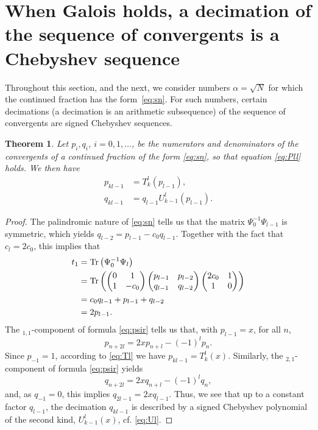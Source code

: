 \documentclass[a4paper,fleqn]{cas-sc}
\def\Tr{{\rm Tr}}
\newtheorem{theorem}{Theorem}[section]
\begin{document}
\section{When Galois holds, a decimation of the sequence of convergents is a Chebyshev sequence}
\label{sec:sec4}
Throughout this section, and the next, we consider numbers $\alpha=\sqrt{N}$ for which the continued fraction has the form~\eqref{eq:sn}. For such numbers, certain decimations (a decimation is an arithmetic subsequence) of the sequence of convergents are signed Chebyshev sequences.
\begin{theorem} \label{thm:tcs}
Let $p_i,q_i$, $i=0,1,\ldots$, be the numerators and denominators of the convergents of a continued fraction of the form \eqref{eq:sn}, so that equation \eqref{eq:Pll} holds. We then have
\begin{equation} \label{eq:pqC}
\begin{split}
p_{kl-1}&=T^l_k(p_{l-1}),\\
q_{kl-1}&=q_{l-1}U^l_{k-1}(p_{l-1}).
\end{split}
\end{equation}
\end{theorem}
\begin{proof}
The palindromic nature of \eqref{eq:sn} tells us that the matrix $\Psi_0^{-1}\Psi_{l-1}$ is symmetric, which yields $q_{l-2}=p_{l-1}-c_0q_{l-1}$. Together with the fact that
$c_l=2c_0$, this implies that
\begin{align*}
t_1&=\Tr\left(\Psi_0^{-1}\Psi_{l}\right)\\
&=\Tr\left(
\begin{pmatrix} 0 & 1 \\ 1 & -c_0 \end{pmatrix}
\begin{pmatrix} p_{l-1} & p_{l-2} \\ q_{l-1} & q_{l-2} \end{pmatrix}
\begin{pmatrix} 2c_0 & 1 \\ 1 & 0 \end{pmatrix}\right)\\
&=c_0q_{l-1}+p_{l-1}+q_{l-2}\\
&=2p_{l-1}.
\end{align*}
The ${}_{1,1}$-component of formula \eqref{eq:psir} tells us that, with $p_{l-1}=x$, for all $n$,
\[
p_{n+2l}=2xp_{n+l}-(-1)^lp_{n}.
\]
Since $p_{-1}=1$, according to \eqref{eq:Tl} we have $p_{kl-1}=T^l_k(x)$.
Similarly, the ${}_{2,1}$-component of formula \eqref{eq:psir} yields
\[
q_{n+2l}=2xq_{n+l}-(-1)^lq_{n},
\]
and, as $q_{-1}=0$, this implies $q_{2l-1}=2xq_{l-1}$. Thus, we see that up to a constant factor $q_{l-1}$, the decimation $q_{kl-1}$ is described by a signed Chebyshev polynomial of the second kind, $U^l_{k-1}(x)$, cf. \eqref{eq:Ul}.
\end{proof}
\end{document}
